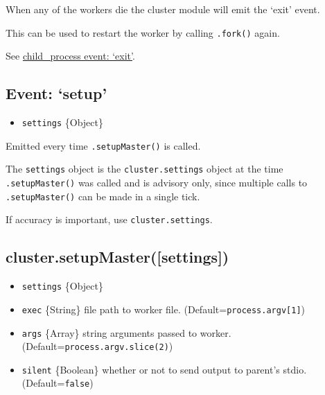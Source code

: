 When any of the workers die the cluster module will emit the `exit'
event.

This can be used to restart the worker by calling \texttt{.fork()}
again.

\begin{Shaded}
\end{Shaded}

See \href{child_process.html\#child_process_event_exit}{child\_process
event: `exit'}.

\subsection{Event: `setup'}\label{event-setup}

\begin{itemize}
\itemsep1pt\parskip0pt
\item
  \texttt{settings} \{Object\}
\end{itemize}

Emitted every time \texttt{.setupMaster()} is called.

The \texttt{settings} object is the \texttt{cluster.settings} object at
the time \texttt{.setupMaster()} was called and is advisory only, since
multiple calls to \texttt{.setupMaster()} can be made in a single tick.

If accuracy is important, use \texttt{cluster.settings}.

\subsection{cluster.setupMaster({[}settings{]})}\label{cluster.setupmastersettings}

\begin{itemize}
\itemsep1pt\parskip0pt
\item
  \texttt{settings} \{Object\}
\item
  \texttt{exec} \{String\} file path to worker file.
  (Default=\texttt{process.argv{[}1{]}})
\item
  \texttt{args} \{Array\} string arguments passed to worker.
  (Default=\texttt{process.argv.slice(2)})
\item
  \texttt{silent} \{Boolean\} whether or not to send output to parent's
  stdio. (Default=\texttt{false})
\end{itemize}

